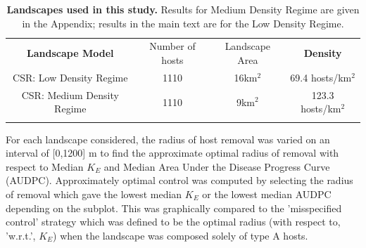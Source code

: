 \documentclass[11pt,letterpaper]{article}
\newlength\savedwidth
\newcommand\thickhline{\noalign{\global\savedwidth\arrayrulewidth\global\arrayrulewidth 2pt}%
\hline
\noalign{\global\arrayrulewidth\savedwidth}}
\begin{document}
\begin{table}

    \begin{tabular}{|c|c|c|c|}
    \thickhline
        \textbf{Landscape Model} & Number of hosts & Landscape Area & \textbf{Density}
     \\
        \thickhline \thickhline
        CSR: Low Density Regime & 1110 & 16km$^{2}$ & 69.4 hosts/km$^{2}$ \\
        \thickhline
        CSR: Medium Density Regime & 1110 & 9km$^{2}$& 123.3 hosts/km$^{2}$ \\
       
        \thickhline
            \end{tabular}
    \caption{\label{lscapes}\textbf{ Landscapes used in this study.} Results for Medium Density Regime are given in the Appendix; results in the main text are for the Low Density Regime.}
\end{table}

For each landscape considered, the radius of host removal was varied on an interval of [0,1200] m to find the approximate optimal radius of removal with respect to Median ${K_{E}}$ and Median Area Under the Disease Progress Curve (AUDPC).
 Approximately optimal control was computed by selecting the radius of removal which gave the lowest median $K_E$ or the lowest median AUDPC depending on the subplot. This was graphically compared to the 'misspecified control' strategy which was defined to be the optimal radius (with respect to, 'w.r.t.', $K_E$) when the landscape was composed solely of type A hosts.

\end{document}
